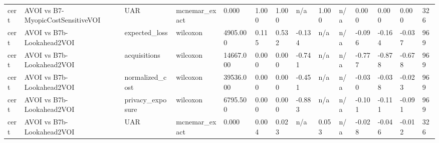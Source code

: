 \begin{table}[!ht]
{\begin{tabular}{llllllllllllll}
cert & AVOI vs B7-MyopicCostSensitiveVOI & UAR & mcnemar\_exact & 0.000 & 1.000 & 1.000 & n/a & 1.000 & n/a & 0.000 & 0.000 & 0.000 & 326 \\
cert & AVOI vs B7b-Lookahead2VOI & expected\_loss & wilcoxon & 4905.000 & 0.115 & 0.532 & -0.134 & n/a & n/a & -0.096 & -0.164 & -0.037 & 969 \\
cert & AVOI vs B7b-Lookahead2VOI & acquisitions & wilcoxon & 14667.000 & 0.000 & 0.000 & -0.741 & n/a & n/a & -0.777 & -0.878 & -0.678 & 969 \\
cert & AVOI vs B7b-Lookahead2VOI & normalized\_cost & wilcoxon & 39536.000 & 0.000 & 0.000 & -0.451 & n/a & n/a & -0.030 & -0.038 & -0.023 & 969 \\
cert & AVOI vs B7b-Lookahead2VOI & privacy\_exposure & wilcoxon & 6795.500 & 0.000 & 0.000 & -0.883 & n/a & n/a & -0.101 & -0.111 & -0.091 & 969 \\
cert & AVOI vs B7b-Lookahead2VOI & UAR & mcnemar\_exact & 0.000 & 0.004 & 0.023 & n/a & 0.053 & n/a & -0.028 & -0.046 & -0.012 & 326 \\
\bottomrule
\end{tabular}}
\end{table}
